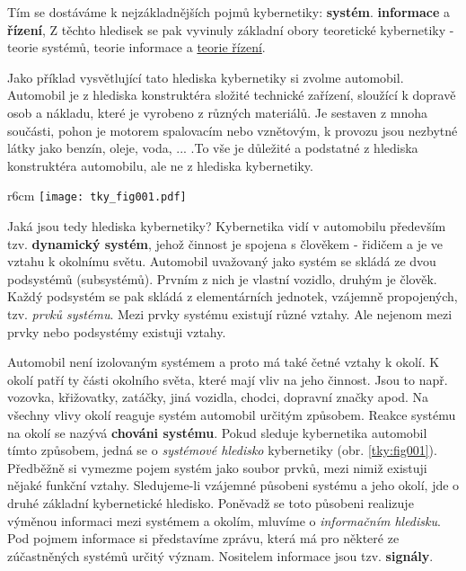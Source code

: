       Tím se dostáváme k nejzákladnějších pojmů kybernetiky: \textbf{systém}. \textbf{informace} a 
      \textbf{řízení}, Z těchto hledisek se pak vyvinuly základní obory teoretické kybernetiky - 
      teorie systémů, teorie informace a \hyperlink{tky:regulace}{teorie řízení}.
      
      Jako příklad vysvětlující tato hlediska kybernetiky si zvolme automobil. Automobil je z 
      hlediska konstruktéra složité technické zařízení, sloužící k dopravě osob a nákladu, které je 
      vyrobeno z různých materiálů. Je sestaven z mnoha součásti, pohon je motorem spalovacím nebo 
      vznětovým, k provozu jsou nezbytné látky jako benzín, oleje, voda, ... .To vše je důležité a 
      podstatné z hlediska konstruktéra automobilu, ale ne z hlediska kybernetiky.

      \begin{wrapfigure}[11]{r}{6cm}   %
        \centering
        \texttt{[image: tky\_fig001.pdf]}
        \caption{ }
        \label{tky:fig001} 
      \end{wrapfigure}
      Jaká jsou tedy hlediska kybernetiky? Kybernetika vidí v automobilu především tzv. 
      \textbf{dynamický systém}, jehož činnost je spojena s člověkem - řidičem a je ve vztahu k 
      okolnímu světu. Automobil uvažovaný jako systém se skládá ze dvou podsystémů (subsystémů). 
      Prvním z nich je vlastní vozidlo, druhým je člověk. Každý podsystém se pak skládá z 
      elementárních jednotek, vzájemně propojených, tzv. \emph{prvků systému}. Mezi prvky systému 
      existují různé vztahy. Ale nejenom mezi prvky nebo podsystémy existuji vztahy.

      Automobil není izolovaným systémem a proto má také četné vztahy k okolí. K okolí  patří ty části okolního světa, které mají vliv na jeho činnost. Jsou to např. 
      vozovka, křižovatky, zatáčky, jiná vozidla, chodci, dopravní značky apod. Na všechny vlivy 
      okolí reaguje systém automobil určitým způsobem. Reakce systému na okolí se nazývá 
      \textbf{chováni systému}. Pokud sleduje kybernetika automobil tímto způsobem, jedná se o 
      \emph{systémové hledisko} kybernetiky  (obr. \ref{tky:fig001}). Předběžně si vymezme pojem 
      systém jako soubor prvků, mezi nimiž existuji nějaké funkční vztahy. Sledujeme-li vzájemné 
      působeni systému a jeho okolí, jde o druhé základní kybernetické hledisko. Poněvadž se toto 
      působeni realizuje výměnou informaci mezi systémem a okolím, mluvíme o \emph{informačním 
      hledisku}. Pod pojmem informace si představíme zprávu, která má pro některé ze zúčastněných 
      systémů určitý význam. Nositelem informace jsou tzv. \textbf{signály}.
      
